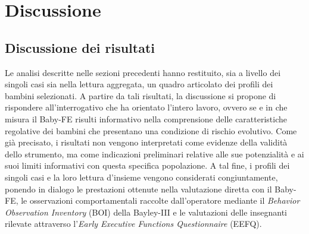 \FloatBarrier
\section{Discussione}
\label{sec:4_4}

 \subsection{Discussione dei risultati}
 \label{sec:4_4_1}

Le analisi descritte nelle sezioni precedenti hanno restituito, sia a livello dei singoli casi sia nella lettura aggregata, un quadro articolato dei profili dei bambini selezionati. A partire da tali risultati, la discussione si propone di rispondere all'interrogativo che ha orientato l'intero lavoro, ovvero se e in che misura il Baby-FE risulti informativo nella comprensione delle caratteristiche regolative dei bambini che presentano una condizione di rischio evolutivo. Come già precisato, i risultati non vengono interpretati come evidenze della validità dello strumento, ma come indicazioni preliminari relative alle sue potenzialità e ai suoi limiti informativi con questa specifica popolazione. A tal fine, i profili dei singoli casi e la loro lettura d'insieme vengono considerati congiuntamente, ponendo in dialogo le prestazioni ottenute nella valutazione diretta con il Baby-FE, le osservazioni comportamentali raccolte dall'operatore mediante il \emph{Behavior Observation Inventory} (BOI) della Bayley-III e le valutazioni delle insegnanti rilevate attraverso l'\emph{Early Executive Functions Questionnaire} (EEFQ).

